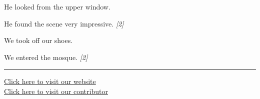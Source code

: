\documentclass[11pt,a4paper]{article}
\newcommand{\pts}[1]{\hfill \textit{[#1]}}
\begin{document}
\begin{parts}
  \item
        \begin{parts}
          \item He looked from the upper window.
          \item He found the scene very impressive. \pts{2}
        \end{parts}

  \item
        \begin{parts}
          \item We took off our shoes.
          \item We entered the mosque. \pts{2}
        \end{parts}
\end{parts}

\vfill
\rule{\linewidth}{0.4pt}

\begin{center}\small
\href{https://bhu-exam.vercel.app/}{Click here to visit our website}\\[4pt]
\href{https://me-aryan.vercel.app/}{Click here to visit our contributor}
\end{center}
\end{document}
